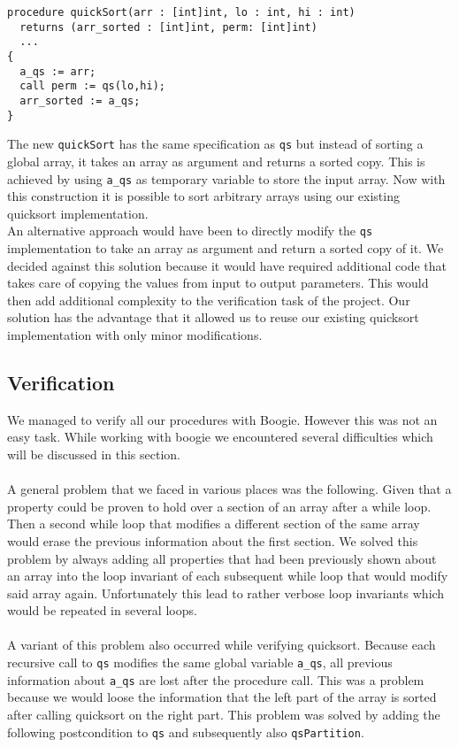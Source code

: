 \begin{verbatim}
procedure quickSort(arr : [int]int, lo : int, hi : int) 
  returns (arr_sorted : [int]int, perm: [int]int) 
  ...
{
  a_qs := arr;
  call perm := qs(lo,hi);
  arr_sorted := a_qs;
}
\end{verbatim}

The new \texttt{quickSort} has the same specification as \texttt{qs} but instead of sorting a global array,
it takes an array as argument and returns a sorted copy. This is achieved by using \texttt{a\_qs} as temporary 
variable to store the input array. Now with this construction it is possible to sort arbitrary arrays using
our existing quicksort implementation.\\

An alternative approach would have been to directly modify the \texttt{qs} implementation to take an array as argument
and return a sorted copy of it. We decided against this solution because it would have required additional code that
takes care of copying the values from input to output parameters. This would then add additional complexity 
to the verification task of the project. Our solution has the advantage that it allowed us to reuse our existing quicksort
implementation with only minor modifications.


\subsection{Verification}

We managed to verify all our procedures with Boogie. However this was not an easy task. While working 
with boogie we encountered several difficulties which will be discussed in this section.\\\\

A general problem that we faced in various places was the following. Given that a property could be proven
to hold over a section of an array after a while loop. Then a second while loop that modifies a different section of the same array
would erase the previous information about the first section. We solved this problem by always adding all properties that
had been previously shown about an array into the loop invariant of each subsequent while loop that would modify 
said array again. Unfortunately this lead to rather verbose loop invariants which would be 
repeated in several loops.
\\\\
A variant of this problem also occurred while verifying quicksort. Because each recursive call 
to \texttt{qs} modifies the same global variable \texttt{a\_qs}, all previous information about \texttt{a\_qs} 
are lost after the procedure call. This was a problem because we would loose the information that the left
part of the array is sorted after calling quicksort on the right part. 
This problem was solved by adding the following postcondition to \texttt{qs} and subsequently also \texttt{qsPartition}.

